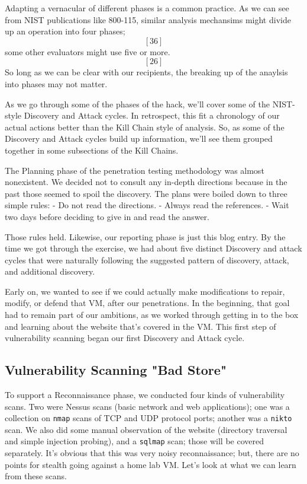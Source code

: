 Adapting a vernacular of different phases is a common practice.  As we can see from NIST publications like 800-115, similar analysis mechansims might divide up an operation into four phases; \[[36]\] some other evaluators might use five or more. \[[26]\]  So long as we can be clear with our recipients, the breaking up of the anaylsis into phases may not matter.

As we go through some of the phases of the hack, we'll cover some of the NIST-style Discovery and Attack cycles.  In retrospect, this fit a chronology of our actual actions better than the Kill Chain style of analysis.  So, as some of the Discovery and Attack cycles build up information, we'll see them grouped together in some subsections of the Kill Chains.  

The Planning phase of the penetration testing methodology was almost nonexistent.  We decided not to consult any in-depth directions because in the past those seemed to spoil the discovery.  The plans were boiled down to three simple rules:
- Do not read the directions.
- Always read the references.
- Wait two days before deciding to give in and read the answer.

Those rules held.  Likewise, our reporting phase is just this blog entry.  By the time we got through the exercise, we had about five distinct Discovery and \gls{attack} cycles that were naturally following the suggested pattern of discovery, attack, and additional discovery.

Early on, we wanted to see if we could actually make modifications to repair, modify, or defend that VM, after our penetrations.  In the beginning, that goal had to remain part of our ambitions, as we worked through getting in to the box and learning about the website that's covered in the VM.  This first step of vulnerability scanning began our first Discovery and Attack cycle.


\subsection{Vulnerability Scanning "Bad Store"}
To support a Reconnaissance phase, we conducted four kinds of vulnerability scans.  Two were Nessus scans (basic network and web applications); one was a collection on \texttt{nmap} scans of TCP and UDP protocol ports; another was a \texttt{nikto} scan.  We also did some manual observation of the website (directory traversal and simple injection probing), and a \texttt{sqlmap} scan; those will be covered separately.  It's obvious that this was very noisy reconnaissance; but, there are no points for stealth going against a home lab VM.  Let's look at what we can learn from these scans.

